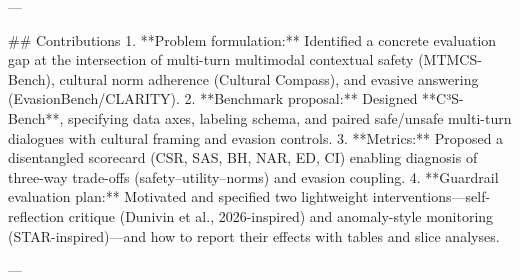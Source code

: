 ---

## Contributions  
1. **Problem formulation:** Identified a concrete evaluation gap at the intersection of multi-turn multimodal contextual safety (MTMCS-Bench), cultural norm adherence (Cultural Compass), and evasive answering (EvasionBench/CLARITY).  
2. **Benchmark proposal:** Designed **C³S-Bench**, specifying data axes, labeling schema, and paired safe/unsafe multi-turn dialogues with cultural framing and evasion controls.  
3. **Metrics:** Proposed a disentangled scorecard (CSR, SAS, BH, NAR, ED, CI) enabling diagnosis of three-way trade-offs (safety–utility–norms) and evasion coupling.  
4. **Guardrail evaluation plan:** Motivated and specified two lightweight interventions—self-reflection critique (Dunivin et al., 2026-inspired) and anomaly-style monitoring (STAR-inspired)—and how to report their effects with tables and slice analyses.

---